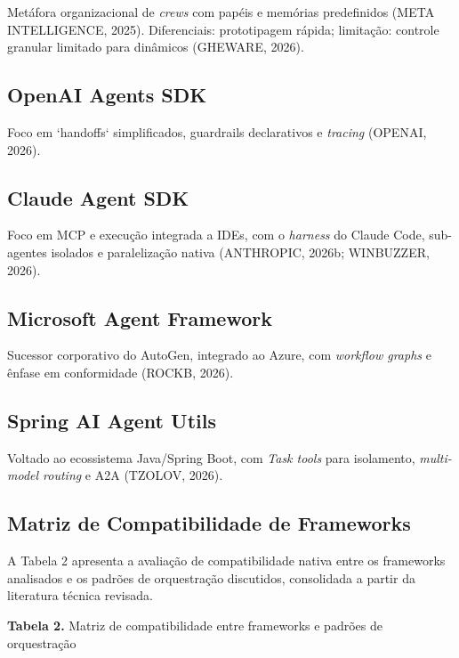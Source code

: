 \documentclass[12pt,a4paper]{article}
\begin{document}
Metáfora organizacional de \textit{crews} com papéis e memórias predefinidos (META INTELLIGENCE, 2025). Diferenciais: prototipagem rápida; limitação: controle granular limitado para dinâmicos (GHEWARE, 2026).

\subsection{OpenAI Agents SDK}

Foco em `handoffs` simplificados, guardrails declarativos e \textit{tracing} (OPENAI, 2026).

\subsection{Claude Agent SDK}

Foco em MCP e execução integrada a IDEs, com o \textit{harness} do Claude Code, sub-agentes isolados e paralelização nativa (ANTHROPIC, 2026b; WINBUZZER, 2026).

\subsection{Microsoft Agent Framework}

Sucessor corporativo do AutoGen, integrado ao Azure, com \textit{workflow graphs} e ênfase em conformidade (ROCKB, 2026).

\subsection{Spring AI Agent Utils}

Voltado ao ecossistema Java/Spring Boot, com \textit{Task tools} para isolamento, \textit{multi-model routing} e A2A (TZOLOV, 2026).

\subsection{Matriz de Compatibilidade de Frameworks}

A Tabela 2 apresenta a avaliação de compatibilidade nativa entre os frameworks analisados e os padrões de orquestração discutidos, consolidada a partir da literatura técnica revisada.

\textbf{Tabela 2.} Matriz de compatibilidade entre frameworks e padrões de orquestração
\end{document}
